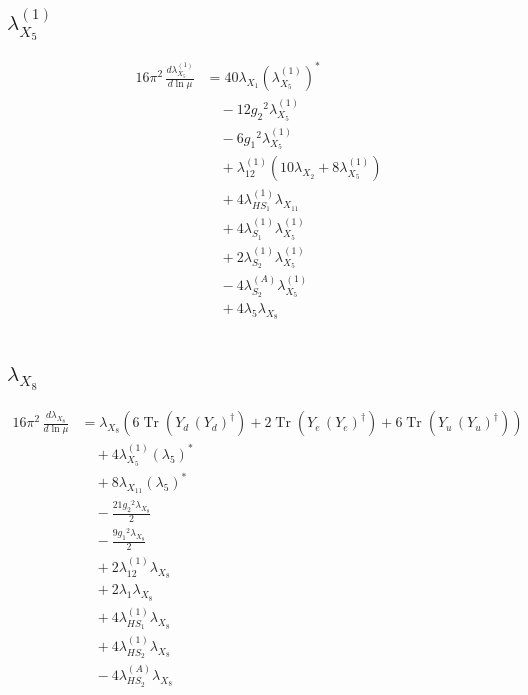 \documentclass[10pt,a4paper]{article}
\begin{document}
\subsection*{$\lambda_{X_{5}}^{(1)}$}
\begin{align*}
16\pi^2\,\frac{d \lambda_{X_{5}}^{(1)}}{d\ln\mu} &=40 {\lambda_{X_{1}}} \left({\lambda_{X_{5}}^{(1)}}\right)^{*} \\
&\quad -12 {g_2}^2 {\lambda_{X_{5}}^{(1)}} \\
&\quad -6 {g_1}^2 {\lambda_{X_{5}}^{(1)}} \\
&\quad +{\lambda_{12}^{(1)}} (10 {\lambda_{X_{2}}}+8 {\lambda_{X_{5}}^{(1)}}) \\
&\quad +4 {\lambda_{HS_1}^{(1)}} {\lambda_{X_{11}}} \\
&\quad +4 {\lambda_{S_1}^{(1)}} {\lambda_{X_{5}}^{(1)}} \\
&\quad +2 {\lambda_{S_2}^{(1)}} {\lambda_{X_{5}}^{(1)}} \\
&\quad -4 {\lambda_{S_2}^{(A)}} {\lambda_{X_{5}}^{(1)}} \\
&\quad +4 {\lambda_5} {\lambda_{X_{8}}} \\
\end{align*}
\subsection*{$\lambda_{X_{8}}$}
\begin{align*}
16\pi^2\,\frac{d \lambda_{X_{8}}}{d\ln\mu} &={\lambda_{X_{8}}} (6 \operatorname{Tr}\!\left({Y_d}\,\left({Y_d}\right)^{\dagger}\right)+2 \operatorname{Tr}\!\left({Y_e}\,\left({Y_e}\right)^{\dagger}\right)+6 \operatorname{Tr}\!\left({Y_u}\,\left({Y_u}\right)^{\dagger}\right)) \\
&\quad +4 {\lambda_{X_{5}}^{(1)}} \left({\lambda_5}\right)^{*} \\
&\quad +8 {\lambda_{X_{11}}} \left({\lambda_5}\right)^{*} \\
&\quad -\frac{21 {g_2}^2 {\lambda_{X_{8}}}}{2} \\
&\quad -\frac{9 {g_1}^2 {\lambda_{X_{8}}}}{2} \\
&\quad +2 {\lambda_{12}^{(1)}} {\lambda_{X_{8}}} \\
&\quad +2 {\lambda_1} {\lambda_{X_{8}}} \\
&\quad +4 {\lambda_{HS_1}^{(1)}} {\lambda_{X_{8}}} \\
&\quad +4 {\lambda_{HS_2}^{(1)}} {\lambda_{X_{8}}} \\
&\quad -4 {\lambda_{HS_2}^{(A)}} {\lambda_{X_{8}}} \\
\end{align*}
\end{document}
